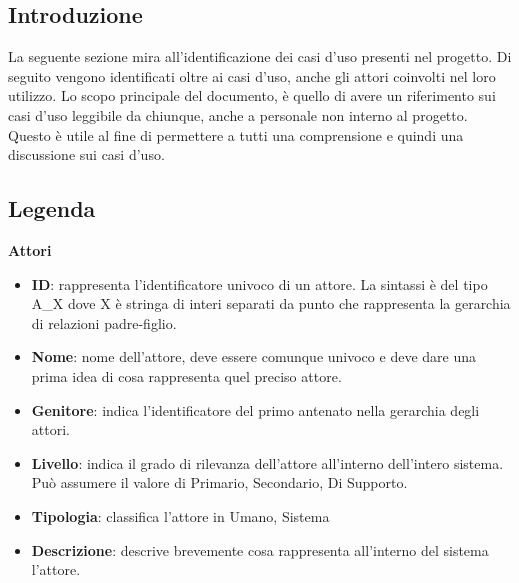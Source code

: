 \setlength{\arrayrulewidth}{.5mm}
\setlength{\tabcolsep}{5pt}
\renewcommand{\arraystretch}{2}
\renewcommand{\labelenumii}{\theenumii}
\renewcommand{\theenumii}{\theenumi.\arabic{enumii}.}

\subsection{Introduzione}
La seguente sezione mira all'identificazione dei casi d'uso presenti nel progetto. Di seguito vengono identificati oltre ai casi d'uso, anche gli attori coinvolti nel loro utilizzo.
Lo scopo principale del documento, è quello di avere un riferimento sui casi d'uso leggibile da chiunque, anche a personale non interno al progetto. Questo è utile al fine di permettere a tutti una comprensione e quindi una discussione sui casi d'uso.

\subsection{Legenda}
\large{\textbf{Attori}} \\
\begin{itemize}[]
	\item \textbf{ID}: rappresenta l'identificatore univoco di un attore. La sintassi è del tipo A\_X dove X è stringa di interi separati da punto che rappresenta la gerarchia di relazioni padre-figlio.
	\item \textbf{Nome}: nome dell'attore, deve essere comunque univoco e deve dare una prima idea di cosa rappresenta quel preciso attore.
	\item \textbf{Genitore}: indica l'identificatore del primo antenato nella gerarchia degli attori.
	\item \textbf{Livello}: indica il grado di rilevanza dell'attore all'interno dell'intero sistema. Può assumere il valore di {Primario, Secondario, Di Supporto}.
	\item \textbf{Tipologia}: classifica l'attore in {Umano, Sistema}
	\item \textbf{Descrizione}: descrive brevemente cosa rappresenta all'interno del sistema l'attore.\\

\end{itemize}


